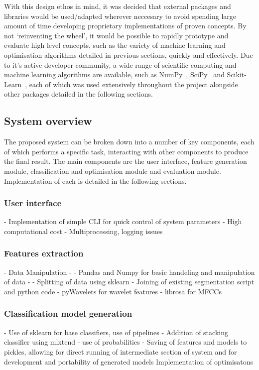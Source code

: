 \documentclass[titlepage, 12pt]{scrartcl} \usepackage{enumitem}
\begin{document}
With this design ethos in mind, it was decided that external packages and
libraries would be used/adapted wherever neccesary to avoid spending large
amount of time developing proprietary implementations of proven concepts. By
not `reinventing the wheel', it would be possible to rapidly prototype and
evaluate high level concepts, such as the variety of machine learning and
optimisation algorithms detailed in previous sections, quickly and effectively.
Due to it's active developer community, a wide range of scientific computing
and machine learning algorithms are available, such as
NumPy~\parencite{VanDerWalt2011}, SciPy~\parencite{Millman2011} and
Scikit-Learn~\parencite{Pedregosa2011}, each of which was used extensively
throughout the project alongside other packages detailed in the following
sections.

\subsection{System overview}
The proposed system can be broken down into a number of key components, each of
which performs a specific task, interacting with other components to produce
the final result. The main components are the user interface, feature
generation module, classification and optimisation module and evaluation
module. Implementation of each is detailed in the following sections.

\subsubsection{User interface}
- Implementation of simple CLI for quick control of system parameters
- High computational cost - Multiprocessing, logging issues
\subsubsection{Features extraction}
- Data Manipulation
- - Pandas and Numpy for basic handeling and manipulation of data
- - Splitting of data using sklearn
- Joining of existing segmentation script and python code
- pyWavelets for wavelet features
- librosa for MFCCs
\subsubsection{Classification model generation}
- Use of sklearn for base classifiers, use of pipelines
- Addition of stacking classifier using mlxtend - use of probabilities
- Saving of features and models to pickles, allowing for direct running of
intermediate section of system and for development and portability of generated models
Implementation of optimisatons
\end{document}
